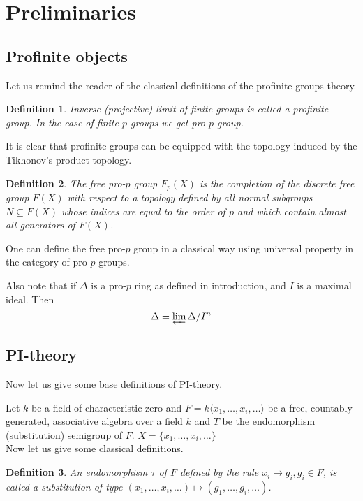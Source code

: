 \documentclass[12pt,a4paper]{article}
\newtheorem{definition}{Definition}
\begin{document}
    \section{Preliminaries}

    \subsection{Profinite objects}
    Let us remind the reader of the classical definitions of the profinite groups theory.
    \vskip 0.1in\noindent
    \begin{definition}
        Inverse (projective) limit of finite groups is called a profinite group.
        In the case of finite $p$-groups we get pro-$p$ group.
    \end{definition}
    \vskip 0.1in\noindent
    It is clear that profinite groups can be equipped with the topology induced by the Tikhonov's product topology.

    \vskip 0.1in\noindent
    \begin{definition}
        The free pro-$p$ group $F_p(X)$ is the completion of the discrete free group $F(X)$ with respect to a topology defined by all normal subgroups $N \subseteq F(X)$ whose indices are equal to the order of $p$ and which contain almost all generators of $F(X)$.
    \end{definition}
    \vskip 0.1in\noindent

    One can define the free pro-$p$ group in a classical way using universal property in the category of pro-$p$ groups.

    Also note that if $\Delta$ is a pro-$p$ ring as defined in introduction, and $I$ is a maximal ideal.
    Then
    \[ \Delta = \varprojlim \Delta/I^n \]

    \subsection{PI-theory}
    Now let us give some base definitions of PI-theory.

    Let $k$ be a field of characteristic zero and $F = k\langle x_1,\ldots,x_i,\ldots\rangle$ be a free, countably generated, associative algebra over a field $k$ and $T$ be the endomorphism (substitution) semigroup of $F$. $X = \{ x_1,\ldots,x_i,\ldots\}$\\
    Now let us give some classical definitions.

    \vskip 0.1in\noindent
    \begin{definition}
        An endomorphism $\tau$ of $F$ defined by the rule $x_i \mapsto g_i, g_i \in F$, is called a substitution of type
        $(x_1,\ldots,x_i,\ldots) \mapsto (g_1,\ldots,g_i,\ldots)$.
    \end{definition}
    \vskip 0.1in\noindent
\end{document}
